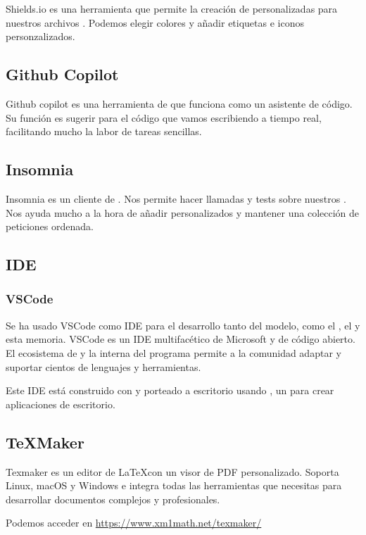 Shields.io es una herramienta que permite la creación de  personalizadas para nuestros archivos . Podemos elegir colores y añadir etiquetas e iconos personzalizados.

\subsection{Github Copilot}

Github copilot es una herramienta de  que funciona como un asistente de código. Su función es sugerir  para el código que vamos escribiendo a tiempo real, facilitando mucho la labor de tareas sencillas.

\subsection{Insomnia}

Insomnia es un cliente de . Nos permite hacer llamadas y tests sobre nuestros . Nos ayuda mucho a la hora de añadir  personalizados y mantener una colección de peticiones ordenada.

\subsection{IDE}

\subsubsection{VSCode}

Se ha usado VSCode como IDE para el desarrollo tanto del modelo, como el , el  y esta memoria. VSCode es un IDE multifacético de Microsoft y de código abierto. El ecosistema de  y la  interna del programa permite a la comunidad adaptar y suportar cientos de lenguajes y herramientas.

Este IDE está construido con  y porteado a escritorio usando , un  para crear aplicaciones de escritorio.

\subsection{\TeX Maker}

Texmaker es un editor de \LaTeX con un visor de PDF personalizado. Soporta Linux, macOS y Windows e integra todas las herramientas que necesitas para desarrollar documentos complejos y profesionales.

Podemos acceder en \url{https://www.xm1math.net/texmaker/}

